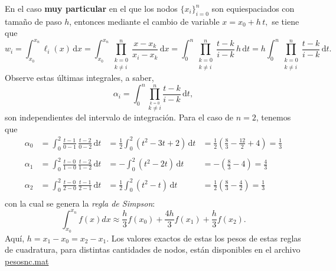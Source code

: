\documentclass[letterpaper,11pt]{article}
\begin{document}
En el caso \textbf{muy particular} en el que los nodos $\{x_i\}_{i=0}^n$ son equiespaciados con tama\~no de paso $h$, entonces mediante el cambio de variable
$
x=x_0+h\,t, 
$
se tiene que
$$
w_i
=	\int_{x_0}^{x_n} \ell_i(x)\,\mathrm{d}x 
=	\int_{x_0}^{x_n}
	\prod_{\substack{k=0\\k\neq i}}^n 
    	\frac{x-x_k}{x_i-x_k}\,\mathrm{d}x
=	\int_{0}^{n}
	\prod_{\substack{k=0\\k\neq i}}^n 
    	\frac{t-k}{i-k}\,h\,\mathrm{d}t   
=	h \int_{0}^{n}
	\prod_{\substack{k=0\\k\neq i}}^n 
    	\frac{t-k}{i-k}\,\mathrm{d}t.
$$
Observe estas \'ultimas integrales, a saber,
 $$
\alpha_i= \int_{0}^{n}
	\prod_{\stackrel{k=0}{k\neq i}}^n 
    	\frac{t-k}{i-k}\,\mathrm{d}t,
 $$
son independientes del intervalo de integraci\'on. Para el caso de $n=2$, tenemos que
 $$
 \begin{array}{cllll}
 \alpha_0 
 &\displaystyle 
 =\int_0^2 \frac{t-1}{0-1} \, \frac{t-2}{0-2}\,\mathrm{d}t
 &\displaystyle
 =\frac{1}{2}\int_0^2 (t^2-3t+2)\,\mathrm{d}t
 &
 =\frac{1}{2}\left(\frac{8}{3}-\frac{12}{2}+4\right)=\frac{1}{3}
\\ \\
\alpha_1 
 &\displaystyle 
 =\int_0^2 \frac{t-0}{1-0} \, \frac{t-2}{1-2}\,\mathrm{d}t
 &\displaystyle
 =-\int_0^2 (t^2-2t)\,\mathrm{d}t
 &
 =-\left(\frac{8}{3}-4\right)=\frac{4}{3}
 \\ \\
\alpha_2 
 &\displaystyle 
 =\int_0^2 \frac{t-0}{2-0} \, \frac{t-1}{2-1}\,\mathrm{d}t
 &\displaystyle
 =\frac{1}{2}\int_0^2 (t^2-t)\,\mathrm{d}t
 &
=\frac{1}{2}\left(\frac{8}{3}-\frac{4}{2}\right) =\frac{1}{3}\\
 \end{array}
 $$
 con la cual se genera la \emph{regla de Simpson}:
 $$
 \displaystyle
 \int_{x_0}^{x_n} f(x)dx \approx \frac{h}{3} f(x_0)+\frac{4h}{3} f(x_1)+\frac{h}{3} f(x_2).
 $$
Aqu\'i, $h = x_1-x_0 = x_2-x_1$. Los valores exactos de estas los pesos de estas reglas de cuadratura, para distintas cantidades de nodos, est\'an disponibles en el archivo
 \href{ftp://ftp.ing-mat.udec.cl/pub/ing-mat/asignaturas/521230/ejercicios/2018-1/pesosnc.mat}{pesosnc.mat}
\end{document}
